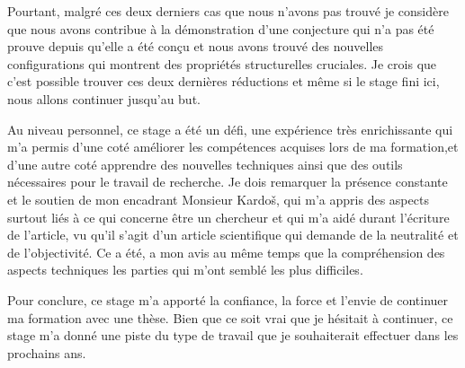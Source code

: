 \documentclass[10pt,a4paper]{article}
\begin{document}
Pourtant, malgré ces deux derniers cas que nous n'avons pas trouvé je considère que nous avons contribue à la démonstration d'une conjecture qui n'a pas été prouve depuis qu'elle a été conçu et nous avons trouvé des nouvelles configurations qui montrent des propriétés structurelles cruciales. Je crois que c'est possible trouver ces deux dernières réductions et même si le stage fini ici, nous allons continuer jusqu'au but. 

Au niveau personnel, ce stage a été un défi, une expérience très enrichissante qui m'a permis d'une coté améliorer les compétences acquises lors de ma formation,et d'une autre coté apprendre des nouvelles techniques ainsi que des outils nécessaires pour le travail de recherche. Je dois remarquer la présence constante et le soutien de mon encadrant Monsieur Kardo\v s, qui m'a appris des aspects surtout liés à ce qui concerne être un chercheur et qui m'a aidé durant l'écriture de l'article, vu qu'il s'agit d'un article scientifique qui demande de la neutralité et de l'objectivité. Ce a été, a mon avis au même temps que la compréhension des aspects techniques les parties qui m'ont semblé les plus difficiles.

Pour conclure, ce stage m'a apporté la confiance, la force et l'envie de continuer ma formation avec une thèse. Bien que ce soit vrai que je hésitait à continuer, ce stage m'a donné une piste du type de travail que je souhaiterait effectuer dans les prochains ans.
\end{document}
